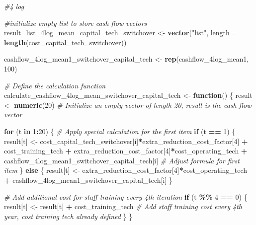 \documentclass[
]{article}
\newenvironment{Shaded}{\begin{snugshade}}{\end{snugshade}}
\newcommand{\AttributeTok}[1]{\textcolor[rgb]{0.13,0.29,0.53}{#1}}
\newcommand{\CommentTok}[1]{\textcolor[rgb]{0.56,0.35,0.01}{\textit{#1}}}
\newcommand{\ControlFlowTok}[1]{\textcolor[rgb]{0.13,0.29,0.53}{\textbf{#1}}}
\newcommand{\DecValTok}[1]{\textcolor[rgb]{0.00,0.00,0.81}{#1}}
\newcommand{\FunctionTok}[1]{\textcolor[rgb]{0.13,0.29,0.53}{\textbf{#1}}}
\newcommand{\NormalTok}[1]{#1}
\newcommand{\OtherTok}[1]{\textcolor[rgb]{0.56,0.35,0.01}{#1}}
\newcommand{\SpecialCharTok}[1]{\textcolor[rgb]{0.81,0.36,0.00}{\textbf{#1}}}
\newcommand{\StringTok}[1]{\textcolor[rgb]{0.31,0.60,0.02}{#1}}
\begin{document}
\begin{Shaded}
\begin{Highlighting}[]
\CommentTok{\#4 log}

\CommentTok{\#initialize empty list to store cash flow vectors}
\NormalTok{result\_list\_4log\_mean\_capital\_tech\_switchover }\OtherTok{\textless{}{-}} \FunctionTok{vector}\NormalTok{(}\StringTok{"list"}\NormalTok{, }\AttributeTok{length =} \FunctionTok{length}\NormalTok{(cost\_capital\_tech\_switchover))}

\NormalTok{cashflow\_4log\_mean1\_switchover\_capital\_tech }\OtherTok{\textless{}{-}} \FunctionTok{rep}\NormalTok{(cashflow\_4log\_mean1, }\DecValTok{100}\NormalTok{)}

\CommentTok{\# Define the calculation function}
\NormalTok{calculate\_cashflow\_4log\_mean\_switchover\_capital\_tech }\OtherTok{\textless{}{-}} \ControlFlowTok{function}\NormalTok{() \{}
\NormalTok{  result }\OtherTok{\textless{}{-}} \FunctionTok{numeric}\NormalTok{(}\DecValTok{20}\NormalTok{)  }\CommentTok{\# Initialize an empty vector of length 20, result is the cash flow vector}
  
  \ControlFlowTok{for}\NormalTok{ (t }\ControlFlowTok{in} \DecValTok{1}\SpecialCharTok{:}\DecValTok{20}\NormalTok{) \{}
    \CommentTok{\# Apply special calculation for the first item}
    \ControlFlowTok{if}\NormalTok{ (t }\SpecialCharTok{==} \DecValTok{1}\NormalTok{) \{}
\NormalTok{      result[t] }\OtherTok{\textless{}{-}}\NormalTok{ cost\_capital\_tech\_switchover[i]}\SpecialCharTok{*}\NormalTok{extra\_reduction\_cost\_factor[}\DecValTok{4}\NormalTok{] }\SpecialCharTok{+}\NormalTok{ cost\_training\_tech }\SpecialCharTok{+}\NormalTok{ extra\_reduction\_cost\_factor[}\DecValTok{4}\NormalTok{]}\SpecialCharTok{*}\NormalTok{cost\_operating\_tech }\SpecialCharTok{+}\NormalTok{ cashflow\_4log\_mean1\_switchover\_capital\_tech[i] }\CommentTok{\# Adjust formula for first item}
\NormalTok{    \} }\ControlFlowTok{else}\NormalTok{ \{}
\NormalTok{      result[t] }\OtherTok{\textless{}{-}}\NormalTok{ extra\_reduction\_cost\_factor[}\DecValTok{4}\NormalTok{]}\SpecialCharTok{*}\NormalTok{cost\_operating\_tech }\SpecialCharTok{+}\NormalTok{ cashflow\_4log\_mean1\_switchover\_capital\_tech[i]}
\NormalTok{    \}}
    
    \CommentTok{\# Add additional cost for staff training every 4th iteration}
    \ControlFlowTok{if}\NormalTok{ (t }\SpecialCharTok{\%\%} \DecValTok{4} \SpecialCharTok{==} \DecValTok{0}\NormalTok{) \{}
\NormalTok{      result[t] }\OtherTok{\textless{}{-}}\NormalTok{ result[t] }\SpecialCharTok{+}\NormalTok{ cost\_training\_tech  }\CommentTok{\# Add staff training cost every 4th year, cost training tech already defined}
\NormalTok{    \}}
\NormalTok{  \}}
  

\end{Highlighting}
\end{Shaded}
\end{document}
